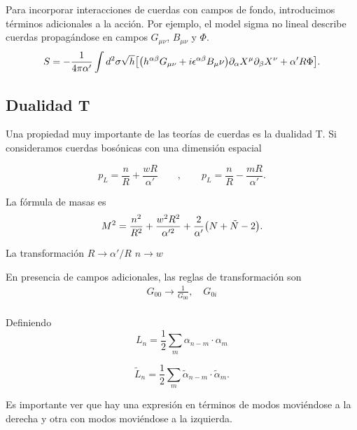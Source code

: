 
Para incorporar interacciones de cuerdas con campos de fondo, introducimos términos adicionales a la acción.
Por ejemplo, el model sigma no lineal describe cuerdas propagándose en campos $G_{\mu\nu}$, $B_{\mu\nu}$ y $\Phi$.
\begin{equation}
  S = -\frac{1}{4\pi \alpha'}\int d^2 \sigma \sqrt h \qty[\qty(h^{\alpha\beta}G_{\mu\nu} + i\epsilon^{\alpha\beta}B_\mu\nu)\partial_\alpha X^\mu
  \partial_\beta X^\nu +\alpha'R\Phi].
\end{equation}

\subsection{Dualidad T}

Una propiedad muy importante de las teorías de cuerdas es la dualidad T.
Si consideramos cuerdas bosónicas con una dimensión espacial

\begin{equation}
  p_L = \frac{n}{R} + \frac{wR}{\alpha'} \qquad,\qquad  p_L = \frac{n}{R} - \frac{mR}{\alpha'} .
\end{equation}

La fórmula de masas es
\begin{equation}
  M^2 = \frac{n^2}{R^2} + \frac{w^2 R^2}{\alpha'^2} +\frac{2}{\alpha'}\qty(N+\tilde N -2).
\end{equation}

La transformación $R\to \alpha'/R$ $n\to w$


En presencia de campos adicionales, las reglas de transformación son
\begin{equation}
  \begin{gathered}
    G_{00}\to \frac{1}{G_{00}}, \quad G_{0i} \\
  \end{gathered}
\end{equation}





Definiendo
\begin{equation}
  L_n=\frac 1 2 \sum_m \alpha_{n-m} \cdot \alpha_m
\end{equation}

\begin{equation}
  \tilde{L}_n=\frac 1 2 \sum_m \tilde{\alpha}_{n-m} \cdot \tilde{\alpha}_m.
\end{equation}

Es importante ver que hay una expresión en términos de modos moviéndose a la derecha
y otra con modos moviéndose a la izquierda.

